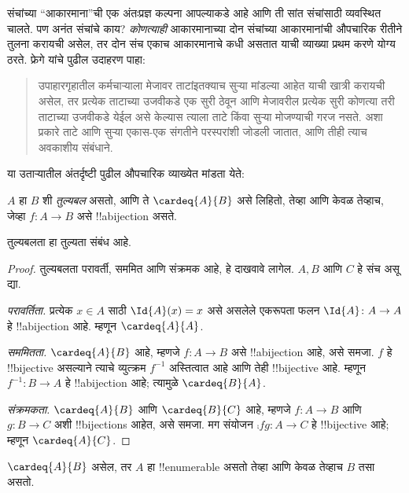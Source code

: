 \documentclass[../../../include/open-logic-section]{subfiles}
\begin{document}


संचांच्या ``आकारमाना''ची एक अंतःप्रज्ञ कल्पना आपल्याकडे आहे आणि ती
सांत संचांसाठी व्यवस्थित चालते. पण अनंत संचांचे काय? \emph{कोणत्याही}
आकारमानाच्या दोन संचांच्या आकारमानांची औपचारिक रीतीने तुलना करायची
असेल, तर दोन संच एकाच आकारमानाचे कधी असतात याची व्याख्या प्रथम करणे
योग्य ठरते. फ्रेगे यांचे पुढील उदाहरण पाहा:
\begin{quote}
  उपाहारगृहातील कर्मचाऱ्याला मेजावर ताटांइतक्याच सुऱ्या मांडल्या आहेत
  याची खात्री करायची असेल, तर प्रत्येक ताटाच्या उजवीकडे एक सुरी ठेवून
  आणि मेजावरील प्रत्येक सुरी कोणत्या तरी ताटाच्या उजवीकडे येईल असे
  केल्यास त्याला ताटे किंवा सुऱ्या मोजण्याची गरज नसते. अशा प्रकारे
  ताटे आणि सुऱ्या एकास-एक संगतीने परस्परांशी जोडली जातात, आणि तीही
  त्याच अवकाशीय संबंधाने. \citep[\S70]{Frege1884}
\end{quote}
या उताऱ्यातील अंतर्दृष्टी पुढील औपचारिक व्याख्येत मांडता येते:

\begin{defn}
  $A$ हा $B$ शी \emph{तुल्यबल} असतो, आणि ते $\cardeq{A}{B}$ असे लिहितो,
  तेव्हा आणि केवळ तेव्हाच, जेव्हा $f \colon A \to B$ असे
  !!a{bijection} असते.
\end{defn}

\begin{prop}
तुल्यबलता हा तुल्यता संबंध आहे.
\end{prop}

\begin{proof}
तुल्यबलता परावर्ती, सममित आणि संक्रमक आहे, हे दाखवावे लागेल. $A, B$
आणि $C$ हे संच असू द्या.

\emph{परावर्तिता.} प्रत्येक $x \in A$ साठी $\Id{A} (x) = x$ असे
असलेले एकरूपता फलन $\Id{A} \colon A \to A$ हे !!a{bijection} आहे.
म्हणून $\cardeq{A}{A}$.

\emph{सममितता.} $\cardeq{A}{B}$ आहे, म्हणजे $f\colon A \to B$ असे
!!a{bijection} आहे, असे समजा. $f$ हे !!{bijective} असल्याने त्याचे
व्युत्क्रम $f^{-1}$ अस्तित्वात आहे आणि तेही !!{bijective} आहे. म्हणून
$f^{-1}\colon B \to A$ हे !!a{bijection} आहे; त्यामुळे
$\cardeq{B}{A}$.

\emph{संक्रमकता.} $\cardeq{A}{B}$ आणि $\cardeq{B}{C}$ आहे, म्हणजे
$f\colon A \to B$ आणि $g\colon B \to
C$ अशी !!{bijection}s आहेत, असे समजा. मग संयोजन
$\comp{f}{g}\colon A \to C$ हे !!{bijective} आहे; म्हणून
$\cardeq{A}{C}$.
\end{proof}

\begin{prop}
$\cardeq{A}{B}$ असेल, तर $A$ हा !!{enumerable} असतो तेव्हा आणि केवळ
तेव्हाच $B$ तसा असतो.
\end{prop}
\end{document}
